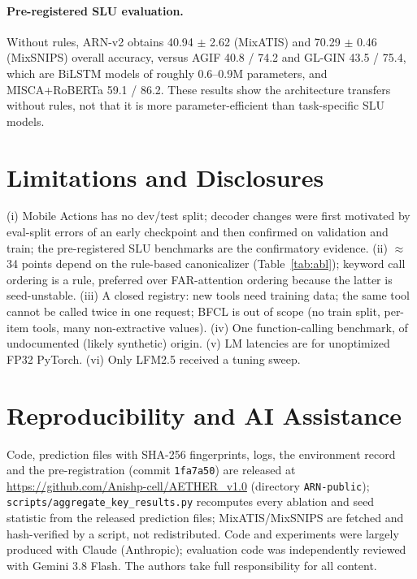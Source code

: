 \documentclass[11pt]{article}
\newcommand{\arn}{ARN-v2}
\begin{document}
\paragraph{Pre-registered SLU evaluation.} Without rules, \arn{} obtains 40.94 $\pm$ 2.62 (MixATIS) and
70.29 $\pm$ 0.46 (MixSNIPS) overall accuracy, versus AGIF 40.8 / 74.2 and GL-GIN 43.5 / 75.4, which are
BiLSTM models of roughly 0.6--0.9M parameters, and MISCA+RoBERTa 59.1 / 86.2. These results show the
architecture transfers without rules, not that it is more parameter-efficient than task-specific SLU models.

\section{Limitations and Disclosures}\label{sec:limits}
(i) Mobile Actions has no dev/test split; decoder changes were first motivated by eval-split errors of an
early checkpoint and then confirmed on validation and train; the pre-registered SLU benchmarks are the
confirmatory evidence. (ii) $\approx$34 points depend on the rule-based canonicalizer (Table~\ref{tab:abl}); keyword call ordering
is a rule, preferred over FAR-attention ordering because the latter is seed-unstable. (iii) A closed registry: new tools need training data; the same tool cannot be called
twice in one request; BFCL is out of scope (no train split, per-item tools, many non-extractive values).
(iv) One function-calling benchmark, of undocumented (likely synthetic) origin. (v) LM latencies are for
unoptimized FP32 PyTorch. (vi) Only LFM2.5 received a tuning sweep.

\section{Reproducibility and AI Assistance}
Code, prediction files with SHA-256 fingerprints, logs, the environment record and the pre-registration
(commit \texttt{1fa7a50}) are released at \url{https://github.com/Anishp-cell/AETHER_v1.0}
(directory \texttt{ARN-public}); \texttt{scripts/aggregate\_key\_results.py} recomputes every ablation and
seed statistic from the released prediction files; MixATIS/MixSNIPS are fetched and hash-verified by a script, not
redistributed. Code and experiments were largely produced with Claude (Anthropic); evaluation code was
independently reviewed with Gemini 3.8 Flash. The authors take full responsibility for all content.



\end{document}
